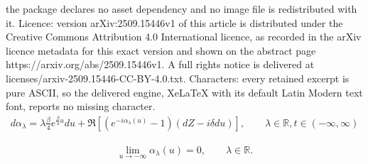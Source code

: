 \documentclass[10pt,a4paper]{amsart}
\newcommand{\R}{{\mathbb R}}
\begin{document}
the package declares no asset dependency and no image file is redistributed with it. Licence: version arXiv:2509.15446v1 of this article is distributed under the Creative Commons Attribution 4.0 International licence, as recorded in the arXiv licence metadata for this exact version and shown on the abstract page https://arxiv.org/abs/2509.15446v1. A full rights notice is delivered at licenses/arxiv-2509.15446-CC-BY-4.0.txt. Characters: every retained excerpt is pure ASCII, so the delivered engine, XeLaTeX with its default Latin Modern text font, reports no missing character.
\begin{align}
    \label{eq:alphaSDE}
	d\alpha_\lambda = \lambda\tfrac{\beta}{4}e^{\frac{\beta}{4}u} du + \Re[(e^{-i\alpha_\lambda(u)}-1)(dZ-i\delta du)],\qquad \lambda\in \R, t\in(-\infty,\infty) 
\end{align}

\begin{align}\label{eq:SDE_initial}
    \lim_{u\to-\infty} \alpha_\lambda(u)=0, \qquad \lambda\in \R. 
\end{align}
\end{document}
